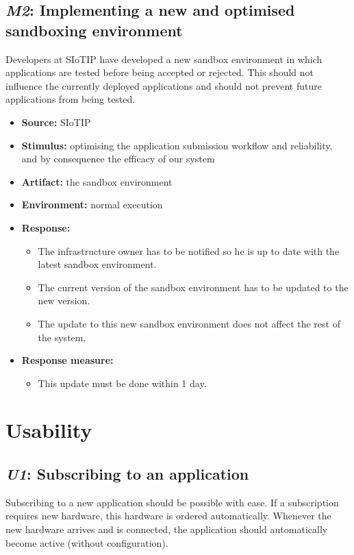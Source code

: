 \documentclass[english]{sareport}
\begin{document}
\subsection{\emph{M2}: Implementing a new and optimised sandboxing environment}
Developers at SIoTIP have developed a new sandbox environment in which applications are tested before being accepted or rejected. This should not influence the currently deployed applications and should not prevent future applications from being tested.
\begin{itemize}
    \item \textbf{Source:} SIoTIP
    \item \textbf{Stimulus:} optimising the application submission workflow and reliability, and by consequence the efficacy of our system 
    \item \textbf{Artifact:} the sandbox environment
    \item \textbf{Environment:} normal execution
    \item \textbf{Response:}
        \begin{itemize}
        	\item The infrastructure owner has to be notified so he is up to date with the latest sandbox environment.
            \item The current version of the sandbox environment has to be updated to the new version.
            \item The update to this new sandbox environment does not affect the rest of the system.
        \end{itemize}

    \item \textbf{Response measure:}
        \begin{itemize}
            \item This update must be done within 1 day.
        \end{itemize}
\end{itemize}

\section{Usability}
\subsection{\emph{U1}: Subscribing to an application}
Subscribing to a new application should be possible with ease. If a subscription requires new hardware, this hardware is ordered automatically. Whenever the new hardware arrives and is connected, the application should automatically become active (without configuration).
\end{document}
